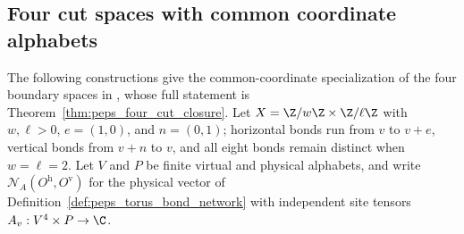 \subsection{Four cut spaces with common coordinate alphabets}
\label{sec:peps_four_cut_common_boundaries}

The following constructions give the common-coordinate specialization of the
four boundary spaces in \cite[Theorem~5.5]{Schuch2010PEPS}, whose full
statement is Theorem~\ref{thm:peps_four_cut_closure}. Let
$X=\Z/w\Z\times\Z/\ell\Z$ with $w,\ell>0$, $e=(1,0)$, and $n=(0,1)$;
horizontal bonds run from $v$ to $v+e$, vertical bonds from $v+n$ to $v$, and
all eight bonds remain distinct when $w=\ell=2$. Let $V$ and $P$ be finite
virtual and physical alphabets, and write $\mathcal N_A(O^{\mathrm h},O^{\mathrm v})$
for the physical vector of Definition~\ref{def:peps_torus_bond_network} with
independent site tensors $A_v:V^4\times P\to\C$.

